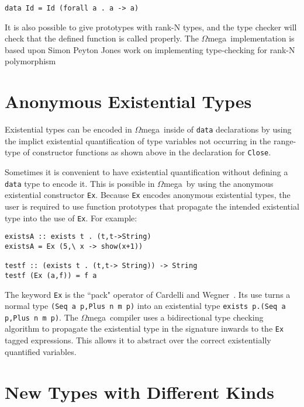\documentclass[11pt,twoside]{article}
\newcommand{\om}{$\Omega$mega}
\begin{document}
\begin{verbatim}
data Id = Id (forall a . a -> a)
\end{verbatim}
It is also possible to give prototypes with rank-N types, and the type checker
will check that the defined function is called properly. The \om\ implementation
is based upon Simon Peyton Jones work on implementing type-checking for
rank-N polymorphism\cite{RankN}

\section{Anonymous Existential Types}\label{exists}
Existential types can be encoded in \om\ inside of {\tt data}
declarations by using the implict existential quantification
of type variables not occurring in the range-type of constructor
functions as shown above in the declaration for {\tt Close}. 

Sometimes it is convenient to have existential quantification
without defining a {\tt data} type to encode it. This is possible
in \om\ by using the anonymous existential constructor {\tt Ex}.
Because {\tt Ex} encodes anonymous existential types, the user is
required to use function prototypes that propagate the
intended existential type into the use of {\tt Ex}. For example:
\begin{verbatim}
existsA :: exists t . (t,t->String)
existsA = Ex (5,\ x -> show(x+1))

testf :: (exists t . (t,t-> String)) -> String
testf (Ex (a,f)) = f a
\end{verbatim}

\noindent The keyword {\tt Ex} is the ``pack" operator of Cardelli and
Wegner~\cite{Cardelli-Wegner85}. Its use turns a normal type 
{\small \verb+(Seq a p,Plus n m p)+} into an existential type 
{\small \verb+exists p.(Seq a p,Plus n m p)+}. The \om\ compiler
uses a bidirectional type checking algorithm to propagate
the existential type in the signature inwards to the
{\tt Ex} tagged expressions. This allows it to
abstract over the correct existentially quantified variables.




\section{New Types with Different Kinds} \label{kinds}
\end{document}
